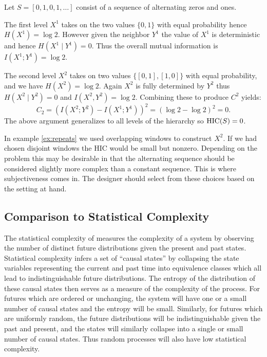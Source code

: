 \begin{example}
  \label{ex:repeats}
  Let $S = [0, 1, 0, 1, \ldots]$ consist of a sequence of alternating zeros and
  ones.

  The first level $X^1$ takes on the two values $\{0, 1\}$ with equal
  probability hence $H(X^1) = \log 2$. However given the neighbor $Y^1$ the
  value of $X^1$ is deterministic and hence $H(X^1 \mid Y^1) = 0$. Thus the
  overall mutual information is $I(X^1; Y^1) = \log 2$.

  The second level $X^2$ takes on two values $\{[0, 1], [1, 0]\}$ with
  equal probability, and we have $H(X^2) = \log 2$. Again $X^2$ is fully
  determined by $Y^2$ thus $H(X^2 \mid Y^2) = 0$ and $I(X^2, Y^2) = \log 2$.
  Combining these to produce $C^2$ yields:
  \begin{equation}
    C_2 = (I(X^2; Y^2) - I(X^1; Y^1))^2 = (\log 2 - \log 2)^2 = 0.
  \end{equation}
  The above argument generalizes to all levels of the hierarchy so $\textup{HIC}(S) = 0$.
\end{example}

In example \ref{ex:repeats} we used overlapping windows to construct $X^2$. If
we had chosen disjoint windows the HIC would be small but nonzero. Depending on
the problem this may be desirable in that the alternating sequence should be
considered slightly more complex than a constant sequence. This is where
subjectiveness comes in. The designer should select from these choices
based on the setting at hand.

\subsection{Comparison to Statistical Complexity}
\label{statistical_complexity}

The statistical complexity of \citet{crutchfield1989inferring} measures the
complexity of a system by observing the number of distinct future distributions
given the present and past states.  Statistical complexity infers a set of
``causal states'' by collapsing the state variables representing the current
and past time into equivalence classes which all lead to indistinguishable
future distributions. The entropy of the distribution of these causal states
then serves as a measure of the complexity of the process. For futures which
are ordered or unchanging, the system will have one or a small number of causal
states and the entropy will be small. Similarly, for futures which are
uniformly random, the future distributions will be indistinguishable given the
past and present, and the states will similarly collapse into a single or small
number of causal states. Thus random processes will also have low statistical
complexity.

